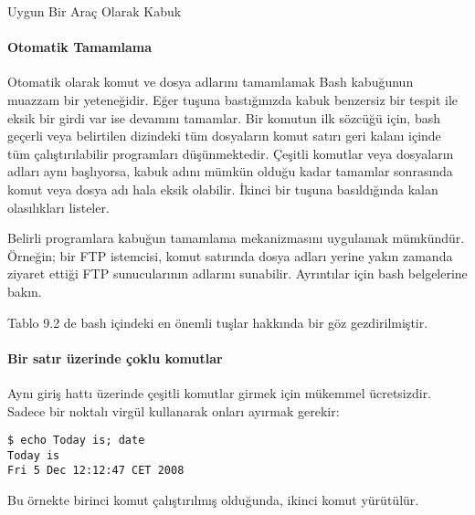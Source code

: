 \begin{section}{Uygun Bir Araç Olarak Kabuk}
\paragraph{Otomatik Tamamlama}{Otomatik olarak komut ve dosya adlarını tamamlamak Bash kabuğunun muazzam bir yeteneğidir. Eğer \Tab tuşuna bastığınızda kabuk benzersiz bir tespit ile eksik bir girdi var ise devamını tamamlar. Bir komutun ilk sözcüğü için, bash geçerli veya belirtilen dizindeki tüm dosyaların komut satırı geri kalanı içinde tüm çalıştırılabilir programları düşünmektedir. Çeşitli komutlar veya dosyaların adları aynı başlıyorsa, kabuk adını mümkün olduğu kadar tamamlar sonrasında komut veya dosya adı hala eksik olabilir. İkinci bir \Tab tuşuna basıldığında kalan olasılıkları listeler.}

Belirli programlara kabuğun tamamlama mekanizmasını uygulamak mümkündür. Örneğin; bir FTP istemcisi, komut satırında dosya adları yerine yakın zamanda ziyaret ettiği FTP sunucularının adlarını sunabilir. Ayrıntılar için bash belgelerine bakın.

Tablo 9.2 de bash içindeki en önemli tuşlar hakkında bir göz gezdirilmiştir.
\paragraph{Bir satır üzerinde çoklu komutlar}{Aynı giriş hattı üzerinde çeşitli komutlar girmek için mükemmel ücretsizdir. Sadece bir noktalı virgül kullanarak onları ayırmak gerekir:
\begin{verbatim}
$ echo Today is; date
Today is
Fri 5 Dec 12:12:47 CET 2008
\end{verbatim}}

Bu örnekte birinci komut çalıştırılmış olduğunda, ikinci komut yürütülür.

\end{section}
